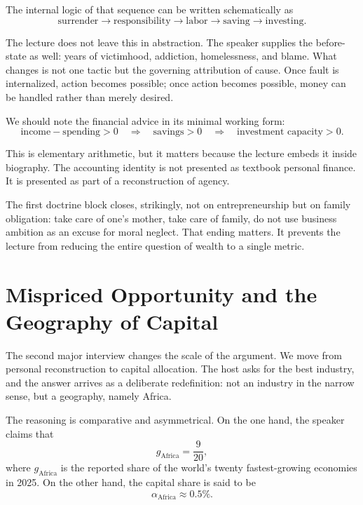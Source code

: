The internal logic of that sequence can be written schematically as
\begin{equation}
\text{surrender}
\to
\text{responsibility}
\to
\text{labor}
\to
\text{saving}
\to
\text{investing}.
\end{equation}

The lecture does not leave this in abstraction. The speaker supplies the before-state as well: years of victimhood, addiction, homelessness, and blame. What changes is not one tactic but the governing attribution of cause. Once fault is internalized, action becomes possible; once action becomes possible, money can be handled rather than merely desired.

We should note the financial advice in its minimal working form:
\begin{equation}
\text{income} - \text{spending} > 0
\quad\Longrightarrow\quad
\text{savings} > 0
\quad\Longrightarrow\quad
\text{investment capacity} > 0.
\end{equation}

This is elementary arithmetic, but it matters because the lecture embeds it inside biography. The accounting identity is not presented as textbook personal finance. It is presented as part of a reconstruction of agency.

The first doctrine block closes, strikingly, not on entrepreneurship but on family obligation: take care of one's mother, take care of family, do not use business ambition as an excuse for moral neglect. That ending matters. It prevents the lecture from reducing the entire question of wealth to a single metric.

\section{Mispriced Opportunity and the Geography of Capital}

The second major interview changes the scale of the argument. We move from personal reconstruction to capital allocation. The host asks for the best industry, and the answer arrives as a deliberate redefinition: not an industry in the narrow sense, but a geography, namely Africa.

The reasoning is comparative and asymmetrical. On the one hand, the speaker claims that
\begin{equation}
g_{\mathrm{Africa}}=\frac{9}{20},
\end{equation}
where \(g_{\mathrm{Africa}}\) is the reported share of the world's twenty fastest-growing economies in 2025. On the other hand, the capital share is said to be
\begin{equation}
\alpha_{\mathrm{Africa}} \approx 0.5\%.
\end{equation}

